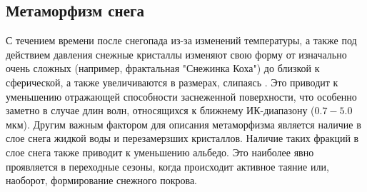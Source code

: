 \documentclass[a4paper, fontsize=14pt]{scrartcl}
\begin{document}
\subsection{Метаморфизм снега}

С течением времени после снегопада из-за изменений температуры, а также под действием давления снежные кристаллы изменяют свою форму от изначально очень сложных (например, фрактальная "Снежинка Коха") до близкой к сферической, а также увеличиваются в размерах, слипаясь \cite{Grenfell1999, Grenfell2005, He2018}. Это приводит к уменьшению отражающей способности заснеженной поверхности, что особенно заметно в случае длин волн, относящихся к ближнему ИК-диапазону ($0.7-5.0$ мкм). Другим важным фактором для описания метаморфизма является наличие в слое снега жидкой воды и перезамерзших кристаллов. Наличие таких фракций в слое снега также приводит к уменьшению альбедо. Это наиболее явно проявляется в переходные сезоны, когда происходит активное таяние или, наоборот, формирование снежного покрова.
\end{document}
